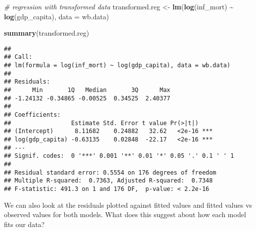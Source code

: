 \documentclass[
]{article}
\newenvironment{Shaded}{\begin{snugshade}}{\end{snugshade}}
\newcommand{\AttributeTok}[1]{\textcolor[rgb]{0.13,0.29,0.53}{#1}}
\newcommand{\CommentTok}[1]{\textcolor[rgb]{0.56,0.35,0.01}{\textit{#1}}}
\newcommand{\DecValTok}[1]{\textcolor[rgb]{0.00,0.00,0.81}{#1}}
\newcommand{\FunctionTok}[1]{\textcolor[rgb]{0.13,0.29,0.53}{\textbf{#1}}}
\newcommand{\NormalTok}[1]{#1}
\newcommand{\OtherTok}[1]{\textcolor[rgb]{0.56,0.35,0.01}{#1}}
\newcommand{\SpecialCharTok}[1]{\textcolor[rgb]{0.81,0.36,0.00}{\textbf{#1}}}
\newcommand{\StringTok}[1]{\textcolor[rgb]{0.31,0.60,0.02}{#1}}
\begin{document}
\begin{Shaded}
\begin{Highlighting}[]
\CommentTok{\# regression with transformed data}
\NormalTok{transformed.reg }\OtherTok{\textless{}{-}} \FunctionTok{lm}\NormalTok{(}\FunctionTok{log}\NormalTok{(inf\_mort) }\SpecialCharTok{\textasciitilde{}} \FunctionTok{log}\NormalTok{(gdp\_capita), }\AttributeTok{data =}\NormalTok{ wb.data)}

\FunctionTok{summary}\NormalTok{(transformed.reg)}
\end{Highlighting}
\end{Shaded}

\begin{verbatim}
## 
## Call:
## lm(formula = log(inf_mort) ~ log(gdp_capita), data = wb.data)
## 
## Residuals:
##      Min       1Q   Median       3Q      Max 
## -1.24132 -0.34865 -0.00525  0.34525  2.40377 
## 
## Coefficients:
##                 Estimate Std. Error t value Pr(>|t|)    
## (Intercept)      8.11682    0.24882   32.62   <2e-16 ***
## log(gdp_capita) -0.63135    0.02848  -22.17   <2e-16 ***
## ---
## Signif. codes:  0 '***' 0.001 '**' 0.01 '*' 0.05 '.' 0.1 ' ' 1
## 
## Residual standard error: 0.5554 on 176 degrees of freedom
## Multiple R-squared:  0.7363, Adjusted R-squared:  0.7348 
## F-statistic: 491.3 on 1 and 176 DF,  p-value: < 2.2e-16
\end{verbatim}

We can also look at the residuals plotted against fitted values and
fitted values vs observed values for both models. What does this suggest
about how each model fits our data?

\begin{Shaded}
\end{Shaded}
\end{document}
